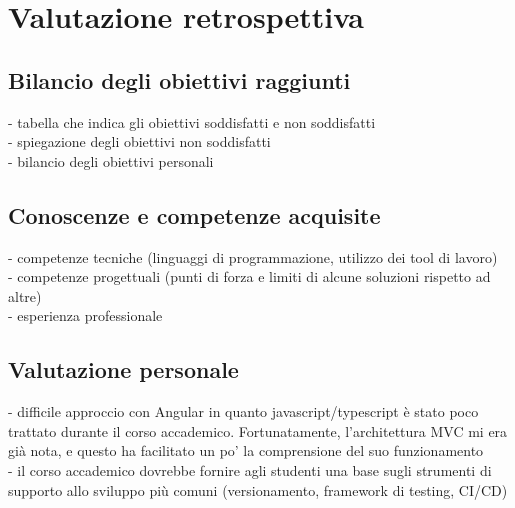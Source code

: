 \newpage
\chapter{Valutazione retrospettiva}
\label{cap:valutazione-retrospettiva}

\section{Bilancio degli obiettivi raggiunti}
- tabella che indica gli obiettivi soddisfatti e non soddisfatti \\
- spiegazione degli obiettivi non soddisfatti\\
- bilancio degli obiettivi personali\\
\section{Conoscenze e competenze acquisite}
- competenze tecniche (linguaggi di programmazione, utilizzo dei tool di lavoro)\\
- competenze progettuali (punti di forza e limiti di alcune soluzioni rispetto ad altre)\\
- esperienza professionale\\
\section{Valutazione personale}
- difficile approccio con Angular in quanto javascript/typescript è stato poco trattato durante il corso accademico. Fortunatamente, l'architettura MVC mi era già nota, e questo ha facilitato un po' la comprensione del suo funzionamento\\
- il corso accademico dovrebbe fornire agli studenti una base sugli strumenti di supporto allo sviluppo più comuni (versionamento, framework di testing, CI/CD)\\